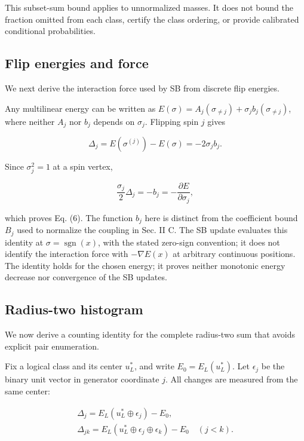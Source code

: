 \documentclass[aps,prapplied,reprint,superscriptaddress,amsmath,amssymb,floatfix,nofootinbib]{revtex4-2}
\begin{document}
This subset-sum bound applies to unnormalized masses. It does not bound
the fraction omitted from each class, certify the class ordering, or
provide calibrated conditional probabilities.

\subsection{Flip energies and
force}\label{a.2.-flip-energies-and-force}

We next derive the interaction force used by SB from discrete flip
energies.

Any multilinear energy can be written as
\(E(\sigma)=A_j(\sigma_{\ne j})+\sigma_j b_j(\sigma_{\ne j})\), where
neither \(A_j\) nor \(b_j\) depends on \(\sigma_j\). Flipping spin \(j\)
gives

\[
\Delta_j=E(\sigma^{(j)})-E(\sigma)=-2\sigma_j b_j.
\]

Since \(\sigma_j^2=1\) at a spin vertex,

\[
\frac{\sigma_j}{2}\Delta_j=-b_j
=-\frac{\partial E}{\partial\sigma_j},
\]

which proves Eq. (6). The function \(b_j\) here is distinct from the
coefficient bound \(B_j\) used to normalize the coupling in Sec. II C.
The SB update evaluates this identity at
\(\sigma=\operatorname{sgn}(x)\), with the stated zero-sign convention;
it does not identify the interaction force with \(-\nabla E(x)\) at
arbitrary continuous positions. The identity holds for the chosen
energy; it proves neither monotonic energy decrease nor convergence of
the SB updates.

\subsection{Radius-two
histogram}\label{a.3.-radius-two-histogram}

We now derive a counting identity for the complete radius-two sum that
avoids explicit pair enumeration.

Fix a logical class and its center \(u_L^*\), and write
\(E_0=E_L(u_L^*)\). Let \(\epsilon_j\) be the binary unit vector in
generator coordinate \(j\). All changes are measured from the same
center:

\[
\begin{gathered}
\Delta_j=E_L(u_L^*\oplus\epsilon_j)-E_0,
\\
\Delta_{jk}=E_L(u_L^*\oplus\epsilon_j\oplus\epsilon_k)-E_0
\quad(j<k).
\end{gathered}
\]
\end{document}
